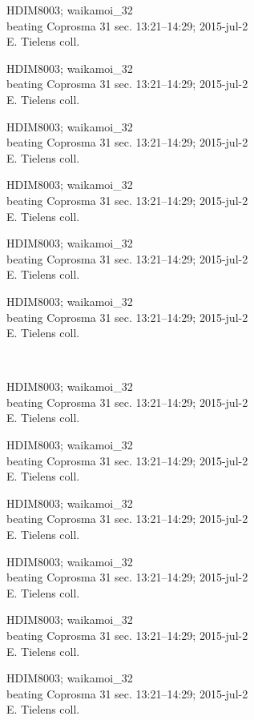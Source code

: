 \documentclass[2pt]{extarticle}
\begin{document}
\noindent
\parbox{0.16\textwidth}{\tiny \raggedright \rule[-0.3\baselineskip]{0pt}{10pt}HDIM8003; waikamoi\_32\\ beating Coprosma 31 sec. 13:21--14:29; 2015-jul-2\\ E. Tielens coll.}
\parbox{0.16\textwidth}{\tiny \raggedright \rule[-0.3\baselineskip]{0pt}{10pt}HDIM8003; waikamoi\_32\\ beating Coprosma 31 sec. 13:21--14:29; 2015-jul-2\\ E. Tielens coll.}
\parbox{0.16\textwidth}{\tiny \raggedright \rule[-0.3\baselineskip]{0pt}{10pt}HDIM8003; waikamoi\_32\\ beating Coprosma 31 sec. 13:21--14:29; 2015-jul-2\\ E. Tielens coll.}
\parbox{0.16\textwidth}{\tiny \raggedright \rule[-0.3\baselineskip]{0pt}{10pt}HDIM8003; waikamoi\_32\\ beating Coprosma 31 sec. 13:21--14:29; 2015-jul-2\\ E. Tielens coll.}
\parbox{0.16\textwidth}{\tiny \raggedright \rule[-0.3\baselineskip]{0pt}{10pt}HDIM8003; waikamoi\_32\\ beating Coprosma 31 sec. 13:21--14:29; 2015-jul-2\\ E. Tielens coll.}
\parbox{0.16\textwidth}{\tiny \raggedright \rule[-0.3\baselineskip]{0pt}{10pt}HDIM8003; waikamoi\_32\\ beating Coprosma 31 sec. 13:21--14:29; 2015-jul-2\\ E. Tielens coll.} \\ 
\vspace{0.001in} 

\noindent
\parbox{0.16\textwidth}{\tiny \raggedright \rule[-0.3\baselineskip]{0pt}{10pt}HDIM8003; waikamoi\_32\\ beating Coprosma 31 sec. 13:21--14:29; 2015-jul-2\\ E. Tielens coll.}
\parbox{0.16\textwidth}{\tiny \raggedright \rule[-0.3\baselineskip]{0pt}{10pt}HDIM8003; waikamoi\_32\\ beating Coprosma 31 sec. 13:21--14:29; 2015-jul-2\\ E. Tielens coll.}
\parbox{0.16\textwidth}{\tiny \raggedright \rule[-0.3\baselineskip]{0pt}{10pt}HDIM8003; waikamoi\_32\\ beating Coprosma 31 sec. 13:21--14:29; 2015-jul-2\\ E. Tielens coll.}
\parbox{0.16\textwidth}{\tiny \raggedright \rule[-0.3\baselineskip]{0pt}{10pt}HDIM8003; waikamoi\_32\\ beating Coprosma 31 sec. 13:21--14:29; 2015-jul-2\\ E. Tielens coll.}
\parbox{0.16\textwidth}{\tiny \raggedright \rule[-0.3\baselineskip]{0pt}{10pt}HDIM8003; waikamoi\_32\\ beating Coprosma 31 sec. 13:21--14:29; 2015-jul-2\\ E. Tielens coll.}
\parbox{0.16\textwidth}{\tiny \raggedright \rule[-0.3\baselineskip]{0pt}{10pt}HDIM8003; waikamoi\_32\\ beating Coprosma 31 sec. 13:21--14:29; 2015-jul-2\\ E. Tielens coll.} \\ 
\vspace{0.001in} 
\end{document}
